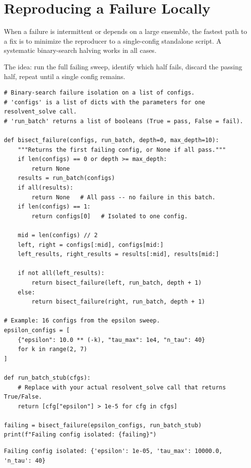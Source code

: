 \section{Reproducing a Failure Locally}
\label{sec:repro-locally}

When a failure is intermittent or depends on a large ensemble, the fastest
path to a fix is to minimize the reproducer to a single-config standalone
script.
A systematic binary-search halving works in all cases.

The idea: run the full failing sweep, identify which half fails, discard
the passing half, repeat until a single config remains.

\begin{lstlisting}[style=grailInStyle]
# Binary-search failure isolation on a list of configs.
# 'configs' is a list of dicts with the parameters for one resolvent_solve call.
# 'run_batch' returns a list of booleans (True = pass, False = fail).

def bisect_failure(configs, run_batch, depth=0, max_depth=10):
    """Returns the first failing config, or None if all pass."""
    if len(configs) == 0 or depth >= max_depth:
        return None
    results = run_batch(configs)
    if all(results):
        return None   # All pass -- no failure in this batch.
    if len(configs) == 1:
        return configs[0]   # Isolated to one config.

    mid = len(configs) // 2
    left, right = configs[:mid], configs[mid:]
    left_results, right_results = results[:mid], results[mid:]

    if not all(left_results):
        return bisect_failure(left, run_batch, depth + 1)
    else:
        return bisect_failure(right, run_batch, depth + 1)

# Example: 16 configs from the epsilon sweep.
epsilon_configs = [
    {"epsilon": 10.0 ** (-k), "tau_max": 1e4, "n_tau": 40}
    for k in range(2, 7)
]

def run_batch_stub(cfgs):
    # Replace with your actual resolvent_solve call that returns True/False.
    return [cfg["epsilon"] > 1e-5 for cfg in cfgs]

failing = bisect_failure(epsilon_configs, run_batch_stub)
print(f"Failing config isolated: {failing}")
\end{lstlisting}

\begin{lstlisting}[style=grailOutStyle]
Failing config isolated: {'epsilon': 1e-05, 'tau_max': 10000.0, 'n_tau': 40}
\end{lstlisting}

